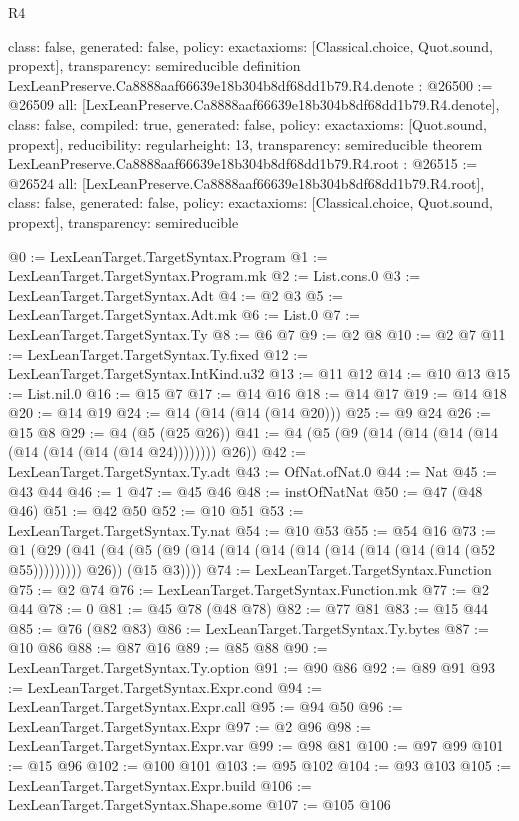 \begin{lexlean}{R4}
\begin{coremodule}
{  class: false,
  generated: false,
  policy: exact{axioms: [Classical.choice, Quot.sound, propext]},
  transparency: semireducible
}
definition LexLeanPreserve.Ca8888aaf66639e18b304b8df68dd1b79.R4.denote : @26500 := @26509 {
  all: [LexLeanPreserve.Ca8888aaf66639e18b304b8df68dd1b79.R4.denote],
  class: false,
  compiled: true,
  generated: false,
  policy: exact{axioms: [Quot.sound, propext]},
  reducibility: regular{height: 13},
  transparency: semireducible
}
theorem LexLeanPreserve.Ca8888aaf66639e18b304b8df68dd1b79.R4.root : @26515 := @26524 {
  all: [LexLeanPreserve.Ca8888aaf66639e18b304b8df68dd1b79.R4.root],
  class: false,
  generated: false,
  policy: exact{axioms: [Classical.choice, Quot.sound, propext]},
  transparency: semireducible
}

@0 := LexLeanTarget.TargetSyntax.Program
@1 := LexLeanTarget.TargetSyntax.Program.mk
@2 := List.cons.{0}
@3 := LexLeanTarget.TargetSyntax.Adt
@4 := @2 @3
@5 := LexLeanTarget.TargetSyntax.Adt.mk
@6 := List.{0}
@7 := LexLeanTarget.TargetSyntax.Ty
@8 := @6 @7
@9 := @2 @8
@10 := @2 @7
@11 := LexLeanTarget.TargetSyntax.Ty.fixed
@12 := LexLeanTarget.TargetSyntax.IntKind.u32
@13 := @11 @12
@14 := @10 @13
@15 := List.nil.{0}
@16 := @15 @7
@17 := @14 @16
@18 := @14 @17
@19 := @14 @18
@20 := @14 @19
@24 := @14 (@14 (@14 (@14 @20)))
@25 := @9 @24
@26 := @15 @8
@29 := @4 (@5 (@25 @26))
@41 := @4 (@5 (@9 (@14 (@14 (@14 (@14 (@14 (@14 (@14 (@14 @24)))))))) @26))
@42 := LexLeanTarget.TargetSyntax.Ty.adt
@43 := OfNat.ofNat.{0}
@44 := Nat
@45 := @43 @44
@46 := 1
@47 := @45 @46
@48 := instOfNatNat
@50 := @47 (@48 @46)
@51 := @42 @50
@52 := @10 @51
@53 := LexLeanTarget.TargetSyntax.Ty.nat
@54 := @10 @53
@55 := @54 @16
@73 := @1
    (@29
      (@41 (@4 (@5 (@9 (@14 (@14 (@14 (@14 (@14 (@14 (@14 (@14 (@52 @55))))))))) @26)) (@15 @3))))
@74 := LexLeanTarget.TargetSyntax.Function
@75 := @2 @74
@76 := LexLeanTarget.TargetSyntax.Function.mk
@77 := @2 @44
@78 := 0
@81 := @45 @78 (@48 @78)
@82 := @77 @81
@83 := @15 @44
@85 := @76 (@82 @83)
@86 := LexLeanTarget.TargetSyntax.Ty.bytes
@87 := @10 @86
@88 := @87 @16
@89 := @85 @88
@90 := LexLeanTarget.TargetSyntax.Ty.option
@91 := @90 @86
@92 := @89 @91
@93 := LexLeanTarget.TargetSyntax.Expr.cond
@94 := LexLeanTarget.TargetSyntax.Expr.call
@95 := @94 @50
@96 := LexLeanTarget.TargetSyntax.Expr
@97 := @2 @96
@98 := LexLeanTarget.TargetSyntax.Expr.var
@99 := @98 @81
@100 := @97 @99
@101 := @15 @96
@102 := @100 @101
@103 := @95 @102
@104 := @93 @103
@105 := LexLeanTarget.TargetSyntax.Expr.build
@106 := LexLeanTarget.TargetSyntax.Shape.some
@107 := @105 @106

\end{coremodule}
\end{lexlean}

